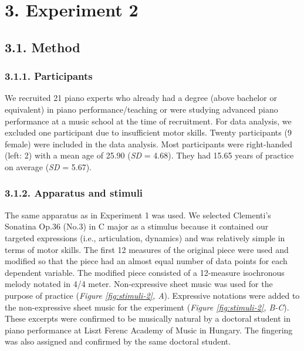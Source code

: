 \documentclass[
  english,
  man,floatsintext]{apa6}
\begin{document}
\newpage

\hypertarget{experiment-2}{%
\section{3. Experiment 2}\label{experiment-2}}

\hypertarget{method-1}{%
\subsection{3.1. Method}\label{method-1}}

\hypertarget{participants-1}{%
\subsubsection{3.1.1. Participants}\label{participants-1}}

We recruited 21 piano experts who already had a degree (above bachelor or equivalent) in piano performance/teaching or were studying advanced piano performance at a music school at the time of recruitment. For data analysis, we excluded one participant due to insufficient motor skills. Twenty participants (9 female) were included in the data analysis. Most participants were right-handed (left: 2) with a mean age of 25.90 (\emph{SD} = 4.68). They had 15.65 years of practice on average (\emph{SD} = 5.67).

\hypertarget{apparatus-and-stimuli-1}{%
\subsubsection{3.1.2. Apparatus and stimuli}\label{apparatus-and-stimuli-1}}

The same apparatus as in Experiment 1 was used. We selected Clementi's Sonatina Op.36 (No.3) in C major as a stimulus because it contained our targeted expressions (i.e., articulation, dynamics) and was relatively simple in terms of motor skills. The first 12 measures of the original piece were used and modified so that the piece had an almost equal number of data points for each dependent variable. The modified piece consisted of a 12-measure isochronous melody notated in 4/4 meter. Non-expressive sheet music was used for the purpose of practice (\emph{Figure \ref{fig:stimuli-2}, A}). Expressive notations were added to the non-expressive sheet music for the experiment (\emph{Figure \ref{fig:stimuli-2}, B-C}). These excerpts were confirmed to be musically natural by a doctoral student in piano performance at Liszt Ferenc Academy of Music in Hungary. The fingering was also assigned and confirmed by the same doctoral student.
\end{document}

